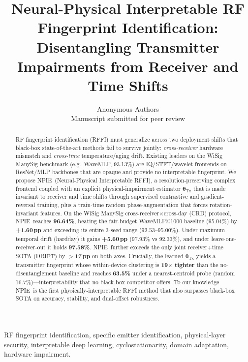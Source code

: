 \documentclass[journal]{IEEEtran}
\newcommand{\npie}{\textsc{NPIE}}
\newcommand{\tx}{\boldsymbol{\theta}_{\mathrm{Tx}}}
\begin{document}
\title{Neural-Physical Interpretable RF Fingerprint Identification:\\Disentangling Transmitter Impairments from Receiver and Time Shifts}

\author{
Anonymous Authors\\
Manuscript submitted for peer review
}

\maketitle

\begin{abstract}
RF fingerprint identification (RFFI) must generalize across two deployment shifts that black-box state-of-the-art methods fail to survive jointly: \emph{cross-receiver} hardware mismatch and \emph{cross-time} temperature/aging drift. Existing leaders on the WiSig ManySig benchmark (e.g.\ WaveMLP, 93.13\%) are IQ/STFT/wavelet frontends on ResNet/MLP backbones that are opaque and provide no interpretable fingerprint. We propose \npie\ (Neural-Physical Interpretable RFFI), a resolution-preserving complex frontend coupled with an explicit physical-impairment estimator $\tx$ that is made invariant to receiver and time shifts through supervised contrastive and gradient-reversal training, plus a train-time random phase-augmentation that forces rotation-invariant features. On the WiSig ManySig cross-receiver$\times$cross-day (CRD) protocol, \npie\ reaches \textbf{96.64\%}, beating the fair-budget WaveMLP@1000 baseline (95.04\%) by \textbf{+1.60\,pp} and exceeding its entire 3-seed range (92.53--95.00\%). Under maximum temporal drift (hardday) it gains \textbf{+5.60\,pp} (97.93\% vs 92.33\%), and under leave-one-receiver-out it holds \textbf{97.58\%}. \npie\ further exceeds the only joint receiver+time SOTA (DRIFT) by \textbf{$>$17\,pp} on both axes. Crucially, the learned $\tx$ yields a transmitter fingerprint whose within-device clustering is \textbf{19$\times$ tighter} than the no-disentanglement baseline and reaches \textbf{63.5\%} under a nearest-centroid probe (random 16.7\%)---interpretability that no black-box competitor offers. To our knowledge \npie\ is the first physically-interpretable RFFI method that also surpasses black-box SOTA on accuracy, stability, and dual-offset robustness.
\end{abstract}

\begin{IEEEkeywords}
RF fingerprint identification, specific emitter identification, physical-layer security, interpretable deep learning, cyclostationarity, domain adaptation, hardware impairment.
\end{IEEEkeywords}
\end{document}
